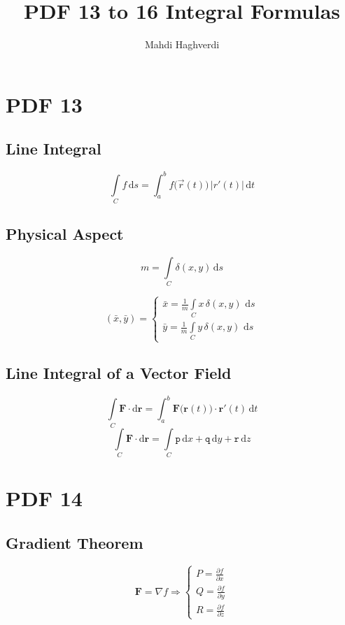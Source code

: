 \documentclass[12pt, fleqn]{book}
\title{PDF 13 to 16 Integral Formulas}
\author{Mahdi Haghverdi}
\newcommand{\D}{\mathrm{d}}
\newcommand{\ic}{\int\limits_C}
\newcommand{\F}{\mathbf{F}}
\newcommand{\br}{\mathbf{r}}
\newcommand{\xy}{(x, y)}
\newcommand{\rond}[2]{\frac{\partial #1}{\partial #2}}
\begin{document}
	\maketitle
	\tableofcontents
	\chapter{PDF 13}\label{pdf13}
	\section{Line Integral}
		\begin{equation}
			\ic  f \, \D s = \int_{a}^{b} f\big(\vec{r}(t)\big) \, \lvert r'(t) \lvert \, \D t
		\end{equation}	
		
	\section{Physical Aspect}
		\begin{equation}
			m = \ic  \delta \xy \, \D s
		\end{equation}
		
		\begin{equation}
			(\bar{x}, \bar{y}) = 
			\begin{cases}
				\bar{x} = \frac{1}{m} \ic  x \, \delta\xy \, \, \D s \\
				\bar{y} = \frac{1}{m} \ic  y \, \delta\xy \, \, \D s
			\end{cases}
		\end{equation}
	
	\section{Line Integral of a Vector Field}
		\begin{equation}
			\ic  \F \cdot \D \br = \int_{a}^{b} \F\big(\br(t)\big) \cdot \br'(t) \, \D t
		\end{equation}
		\begin{equation}
			\ic  \F \cdot \D \br = \ic  \mathtt{p} \, \D x + \mathtt{q} \, \D y + \mathtt{r} \, \D z
		\end{equation}    
	
	\chapter{PDF 14}\label{pdf14}
	\section{Gradient Theorem}
		\begin{equation}
			\F = \nabla f \Rightarrow
			\begin{cases}
				P = \rond{f}{x} \\
				Q = \rond{f}{y} \\
				R = \rond{f}{z} 
			\end{cases}
		\end{equation} 
	
\end{document}
